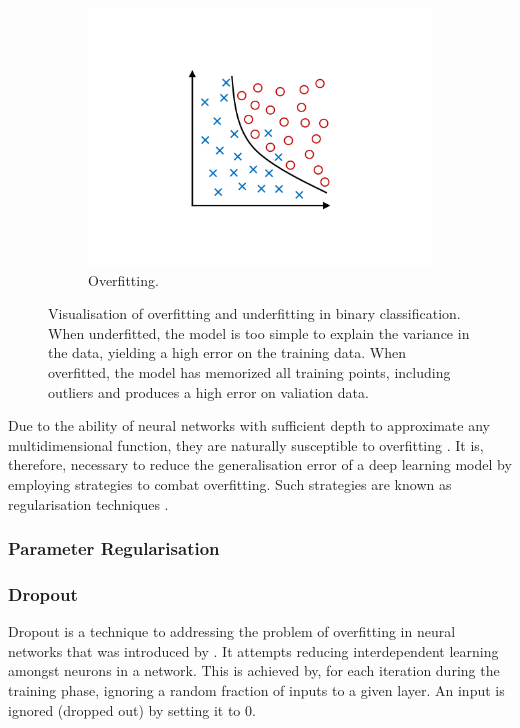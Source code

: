 \documentclass{l4proj}
\begin{document}
\begin{figure}[ht]
\begin{subfigure}[h!]{0.3\textwidth}
    \includegraphics[width=\textwidth, page={3}, trim={6.5cm 4cm 6.5cm 4cm}, clip]{images/Overfitting}
    \caption{Overfitting.}
  \end{subfigure}
  \caption{Visualisation of overfitting and underfitting in binary classification. When underfitted, the model is too simple to explain the variance in the data, yielding a high error on the training data. When overfitted, the model has memorized all training points, including outliers and produces a high error on valiation data.}
  \label{fig:fitting}
\end{figure}

Due to the ability of neural networks with sufficient depth to approximate any multidimensional function, they are naturally susceptible to overfitting \citep{tetko_neural_1995}. It is, therefore, necessary to reduce the generalisation error of a deep learning model by employing strategies to combat overfitting. Such strategies are known as regularisation techniques \citep{goodfellow_deep_2016}.

\subsubsection{Parameter Regularisation}

\subsubsection{Dropout}

Dropout is a technique to addressing the problem of overfitting in neural networks that was introduced by \citet{srivastava_dropout_2014}. It attempts reducing interdependent learning amongst neurons in a network. This is achieved by, for each iteration during the training phase, ignoring a random fraction of inputs to a given layer. An input is ignored (dropped out) by setting it to 0.
\end{document}

